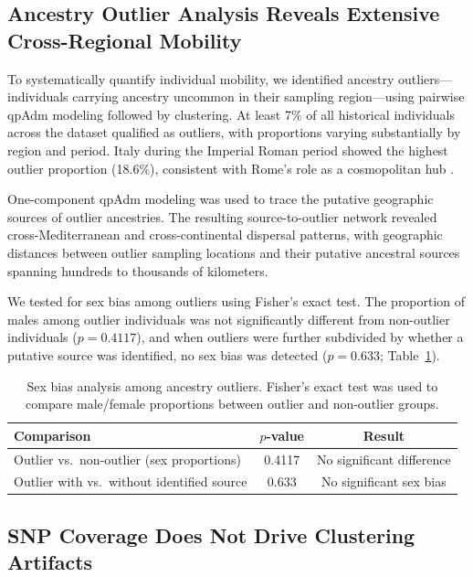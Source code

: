 \documentclass[11pt]{article}
\begin{document}
\subsection{Ancestry Outlier Analysis Reveals Extensive Cross-Regional Mobility}

To systematically quantify individual mobility, we identified ancestry outliers---individuals carrying ancestry uncommon in their sampling region---using pairwise qpAdm modeling followed by clustering. At least 7\% of all historical individuals across the dataset qualified as outliers, with proportions varying substantially by region and period. Italy during the Imperial Roman period showed the highest outlier proportion (18.6\%), consistent with Rome's role as a cosmopolitan hub \citep{antonio2019ancient}.

One-component qpAdm modeling was used to trace the putative geographic sources of outlier ancestries. The resulting source-to-outlier network revealed cross-Mediterranean and cross-continental dispersal patterns, with geographic distances between outlier sampling locations and their putative ancestral sources spanning hundreds to thousands of kilometers.

We tested for sex bias among outliers using Fisher's exact test. The proportion of males among outlier individuals was not significantly different from non-outlier individuals ($p = 0.4117$), and when outliers were further subdivided by whether a putative source was identified, no sex bias was detected ($p = 0.633$; Table~\ref{tab:sex_bias}).

\begin{table}[H]
\centering
\caption{Sex bias analysis among ancestry outliers. Fisher's exact test was used to compare male/female proportions between outlier and non-outlier groups.}
\label{tab:sex_bias}
\begin{tabular}{lcc}
\toprule
\textbf{Comparison} & \textbf{$p$-value} & \textbf{Result} \\
\midrule
Outlier vs.\ non-outlier (sex proportions) & 0.4117 & No significant difference \\
Outlier with vs.\ without identified source & 0.633 & No significant sex bias \\
\bottomrule
\end{tabular}
\end{table}

\subsection{SNP Coverage Does Not Drive Clustering Artifacts}
\end{document}
